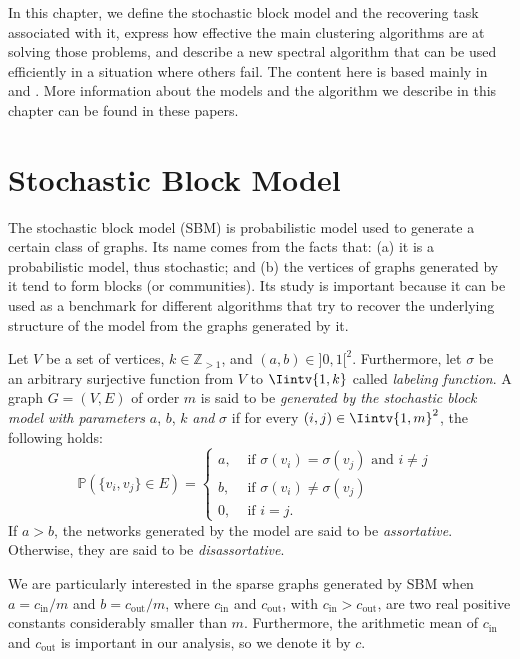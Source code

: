 In this chapter, we define the stochastic block model and the recovering task associated with it, express how effective the main clustering algorithms are at solving those problems, and describe a new spectral algorithm that can be used efficiently in a situation where others fail.
The content here is based mainly in \cite{bethe2} and \cite{bethe}.
More information about the models and the algorithm we describe in this chapter can be found in these papers.


\section{Stochastic Block Model}
The stochastic block model (SBM) is probabilistic model used to generate a certain class of graphs.
Its name comes from the facts that: (a) it is a probabilistic model, thus stochastic; and (b) the vertices of graphs generated by it tend to form blocks (or communities).
Its study is important because it can be used as a benchmark for different algorithms that try to recover the underlying structure of the model from the graphs generated by it.

\begin{definition}
   Let $V$ be a set of vertices, $k \in \mathbb Z_{>1}$, and $(a,b) \in {]0,1[}^2 $.
   Furthermore, let $\sigma$ be an arbitrary surjective function from $V$ to $\Iintv{1,k}$ called \textit{labeling function}.
   A graph $G=(V,E)$ of order $m$ is said to be \textit{generated by the stochastic block model with parameters} $a$, $b$, $k$ \textit{and} $\sigma$ if for every $(i,j) \in \Iintv{1,m}^2$, the following holds:
   \begin{equation}
      \mathbb P (\{v_i, v_j\} \in E) =
      \begin{cases}
         a, & \text{ if $\sigma (v_i) = \sigma (v_j)$ and $i \ne j$ } \\
         b, & \text{ if $\sigma (v_i) \ne \sigma (v_j)$ } \\
         0, & \text{ if $i = j$. }
      \end{cases}
   \end{equation}
   If $a > b$, the networks generated by the model are said to be \textit{assortative}. 
   Otherwise, they are said to be \textit{disassortative}. 
\end{definition}

\begin{remark}
   We are particularly interested in the sparse graphs generated by SBM when $a = c_{\text{in}}/m$ and $b = c_{\text{out}}/m$, where $c_\text{in}$ and $c_\text{out}$, with $c_\text{in} > c_\text{out}$, are two real positive constants considerably smaller than $m$. 
   Furthermore, the arithmetic mean of $c_\text{in}$ and $c_\text{out}$ is important in our analysis, so we denote it by $c$.
\end{remark}

